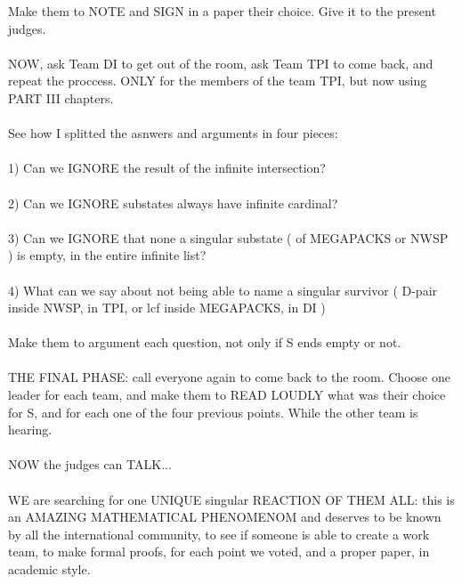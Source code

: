 		\noindent
		Make them to NOTE and SIGN in a paper their choice. Give it to the present judges.
		\\\\
		
		\noindent
		NOW, ask Team DI to get out of the room, ask Team TPI to come back, and repeat the proccess. ONLY for the members of the team TPI, but now using PART III chapters.
		\\\\
		
		\noindent
		See how I splitted the asnwers and arguments in four pieces:\\\\
		1) Can we IGNORE the result of the infinite intersection?\\\\
		2) Can we IGNORE substates always have infinite cardinal?\\\\
		3) Can we IGNORE that none a singular substate ( of MEGAPACKS or NWSP ) is empty, in the entire infinite list?\\\\
		4) What can we say about not being able to name a singular survivor ( D-pair inside NWSP, in TPI, or lcf inside MEGAPACKS, in DI )
		\\\\
		
		\noindent
		Make them to argument each question, not only if S ends empty or not.
		\\\\
		
		\noindent
		THE FINAL PHASE: call everyone again to come back to the room. Choose one leader for each team, and make them to READ LOUDLY what was their choice for S, and for each one of the four previous points. While the other team is hearing.
		\\\\
		
		\noindent
		NOW the judges can TALK...
		\\\\
		
		\noindent
		WE are searching for one UNIQUE singular REACTION OF THEM ALL: this is an AMAZING MATHEMATICAL PHENOMENOM and deserves to be known by all the international community, to see if someone is able to create a work team, to make formal proofs, for each point we voted, and a proper paper, in academic style.
		\\\\
		
